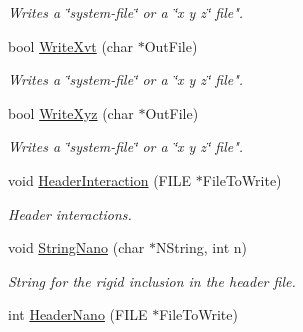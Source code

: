 \begin{DoxyCompactItemize}
\begin{DoxyCompactList}\small\item\em \-Writes a \char`\"{}system-\/file\char`\"{} or a \char`\"{}x y z\char`\"{} file". \end{DoxyCompactList}\item 
\hypertarget{classVarData_a4bed1297ee4f1c6966e1f8389e3b34c8}{bool \hyperlink{classVarData_a4bed1297ee4f1c6966e1f8389e3b34c8}{\-Write\-Xvt} (char $\ast$\-Out\-File)}\label{classVarData_a4bed1297ee4f1c6966e1f8389e3b34c8}

\begin{DoxyCompactList}\small\item\em \-Writes a \char`\"{}system-\/file\char`\"{} or a \char`\"{}x y z\char`\"{} file". \end{DoxyCompactList}\item 
\hypertarget{classVarData_a842c747bebda7f52b905605b1446c814}{bool \hyperlink{classVarData_a842c747bebda7f52b905605b1446c814}{\-Write\-Xyz} (char $\ast$\-Out\-File)}\label{classVarData_a842c747bebda7f52b905605b1446c814}

\begin{DoxyCompactList}\small\item\em \-Writes a \char`\"{}system-\/file\char`\"{} or a \char`\"{}x y z\char`\"{} file". \end{DoxyCompactList}\item 
\hypertarget{classVarData_a4a4c970350675e5a82a935c754264d14}{void \hyperlink{classVarData_a4a4c970350675e5a82a935c754264d14}{\-Header\-Interaction} (\-F\-I\-L\-E $\ast$\-File\-To\-Write)}\label{classVarData_a4a4c970350675e5a82a935c754264d14}

\begin{DoxyCompactList}\small\item\em \-Header interactions. \end{DoxyCompactList}\item 
\hypertarget{classVarData_ab0cc3088657341d2696949515927e91c}{void \hyperlink{classVarData_ab0cc3088657341d2696949515927e91c}{\-String\-Nano} (char $\ast$\-N\-String, int n)}\label{classVarData_ab0cc3088657341d2696949515927e91c}

\begin{DoxyCompactList}\small\item\em \-String for the rigid inclusion in the header file. \end{DoxyCompactList}\item 
\hypertarget{classVarData_af86d3fd2dc311c093cd03f65eb3fadd9}{int \hyperlink{classVarData_af86d3fd2dc311c093cd03f65eb3fadd9}{\-Header\-Nano} (\-F\-I\-L\-E $\ast$\-File\-To\-Write)}\label{classVarData_af86d3fd2dc311c093cd03f65eb3fadd9}


\end{DoxyCompactItemize}
